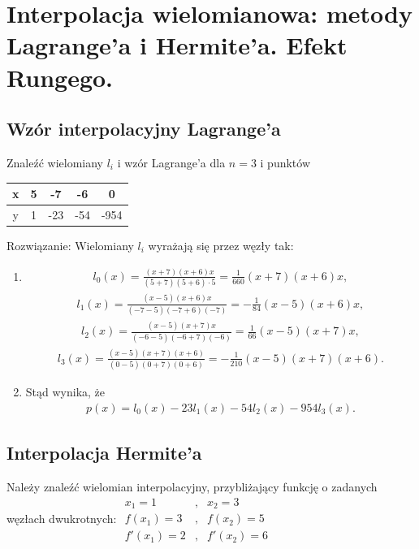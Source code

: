 \documentclass[12pt]{article}
\begin{document}
    \newpage

    \section{Interpolacja wielomianowa: metody Lagrange'a i Hermite'a. Efekt Rungego.}

    \subsection{Wzór interpolacyjny Lagrange'a}
    \begin{exercise}
        Znaleźć wielomiany $l_i$ i wzór Lagrange'a dla $n=3$ i punktów
        \begin{tabular}{|c|c|c|c|c|}
            \hline
            x & 5 & -7 & -6 & 0    \\ \hline
            y & 1 & -23 & -54 & -954 \\ \hline
        \end{tabular}
    \end{exercise}
    Rozwiązanie:
    Wielomiany $l_i$ wyrażają się przez węzły tak:
    \begin{enumerate}
        \item
        \begin{align*}
            l_0(x)=\frac{(x+7)(x+6)x}{(5+7)(5+6)\cdot5}=\frac{1}{660}(x+7)(x+6)x,
        \end{align*}
        \begin{align*}
            l_1(x)=\frac{(x-5)(x+6)x}{(-7-5)(-7+6)(-7)}=-\frac{1}{84}(x-5)(x+6)x,
        \end{align*}
        \begin{align*}
            l_2(x)=\frac{(x-5)(x+7)x}{(-6-5)(-6+7)(-6)}=\frac{1}{66}(x-5)(x+7)x,
        \end{align*}
        \begin{align*}
            l_3(x)=\frac{(x-5)(x+7)(x+6)}{(0-5)(0+7)(0+6)}=-\frac{1}{210}(x-5)(x+7)(x+6).
        \end{align*}


        \item
        Stąd wynika, że
        \begin{align*}
            p(x)=l_0(x)-23l_1(x)-54l_2(x)-954l_3(x).
        \end{align*}
    \end{enumerate}

    \subsection{Interpolacja Hermite’a}
    \begin{exercise}
        Należy znaleźć wielomian interpolacyjny, przybliżający funkcję o zadanych węzłach dwukrotnych:
        ${\begin{array}{lcl}
              x_{1}=1&,&x_{2}=3\\f(x_{1})=3&,&f(x_{2})=5\\f'(x_{1})=2&,&f'(x_{2})=6
        \end{array}}$
    \end{exercise}
\end{document}
